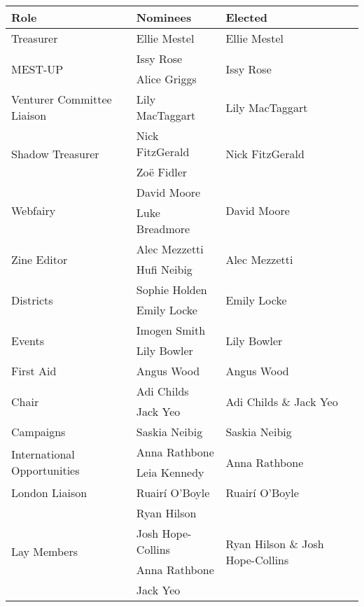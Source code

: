 \documentclass[a4paper, 11pt]{article} %
\begin{document}
\begin{center}
	\begin{tabular}[H]{l || l | l}
	Role						& Nominees		& Elected \\ \hline \hline
	Treasurer					& Ellie Mestel		& Ellie Mestel \\ \hline
	\multirow{2}{*}{MEST-UP}	& Issy Rose		& \multirow{2}{*}{Issy Rose} \\
							& Alice Griggs		& \\ \hline
	Venturer Committee Liaison	& Lily MacTaggart	& Lily MacTaggart \\ \hline
	\multirow{2}{*}{Shadow Treasurer}	& Nick FitzGerald	& \multirow{2}{*}{Nick FitzGerald} \\
							& Zoë Fidler		& \\ \hline
	\multirow{2}{*}{Webfairy}	& David Moore		& \multirow{2}{*}{David Moore} \\
							& Luke Breadmore	& \\ \hline
	\multirow{2}{*}{Zine Editor}	& Alec Mezzetti	& \multirow{2}{*}{Alec Mezzetti} \\
							& Hufi Neibig		& \\ \hline
	\multirow{2}{*}{Districts}	& Sophie Holden	& \multirow{2}{*}{Emily Locke} \\
							& Emily Locke		& \\ \hline
	\multirow{2}{*}{Events}	& Imogen Smith	& \multirow{2}{*}{Lily Bowler} \\
							& Lily Bowler		& \\ \hline
	First Aid					& Angus Wood		& Angus Wood \\ \hline
	\multirow{2}{*}{Chair}		& Adi Childs		& \multirow{2}{*}{Adi Childs \& Jack Yeo} \\
							& Jack Yeo		& \\ \hline
	Campaigns				& Saskia Neibig	& Saskia Neibig \\ \hline
	\multirow{2}{*}{International Opportunities}	& Anna Rathbone	& \multirow{2}{*}{Anna Rathbone} \\
							& Leia Kennedy	& \\ \hline
	London Liaison				& Ruairí O'Boyle	& Ruairí O'Boyle \\ \hline
	\multirow{5}{*}{Lay Members}	& Ryan Hilson	& \multirow{5}{*}{Ryan Hilson \& Josh Hope-Collins} \\
							& Josh Hope-Collins	& \\
							& Anna Rathbone	& \\
							& Jack Yeo		& \\

\end{tabular}
\end{center}
\end{document}
